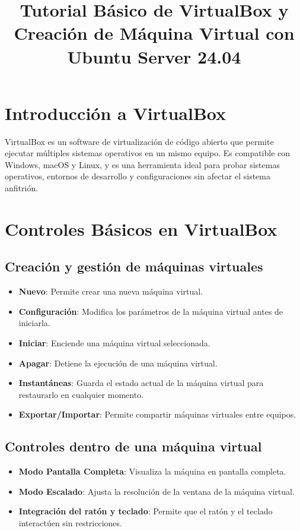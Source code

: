 \documentclass{article}
\title{Tutorial Básico de VirtualBox y Creación de Máquina Virtual con Ubuntu Server 24.04}
\author{}
\date{}
\begin{document}
\maketitle

\section{Introducción a VirtualBox}
VirtualBox es un software de virtualización de código abierto que permite ejecutar múltiples sistemas operativos en un mismo equipo. Es compatible con Windows, macOS y Linux, y es una herramienta ideal para probar sistemas operativos, entornos de desarrollo y configuraciones sin afectar el sistema anfitrión.

\section{Controles Básicos en VirtualBox}

\subsection{Creación y gestión de máquinas virtuales}
\begin{itemize}
    \item \textbf{Nuevo}: Permite crear una nueva máquina virtual.
    \item \textbf{Configuración}: Modifica los parámetros de la máquina virtual antes de iniciarla.
    \item \textbf{Iniciar}: Enciende una máquina virtual seleccionada.
    \item \textbf{Apagar}: Detiene la ejecución de una máquina virtual.
    \item \textbf{Instantáneas}: Guarda el estado actual de la máquina virtual para restaurarlo en cualquier momento.
    \item \textbf{Exportar/Importar}: Permite compartir máquinas virtuales entre equipos.
\end{itemize}

\subsection{Controles dentro de una máquina virtual}
\begin{itemize}
    \item \textbf{Modo Pantalla Completa}: Visualiza la máquina en pantalla completa.
    \item \textbf{Modo Escalado}: Ajusta la resolución de la ventana de la máquina virtual.
    \item \textbf{Integración del ratón y teclado}: Permite que el ratón y el teclado interactúen sin restricciones.
\end{itemize}
\end{document}
